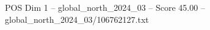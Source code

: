 \begin{textsample}{POS Dim 1 – global\_north\_2024\_03 – Score 45.00 – global\_north\_2024\_03/106762127.txt}
\end{textsample}
